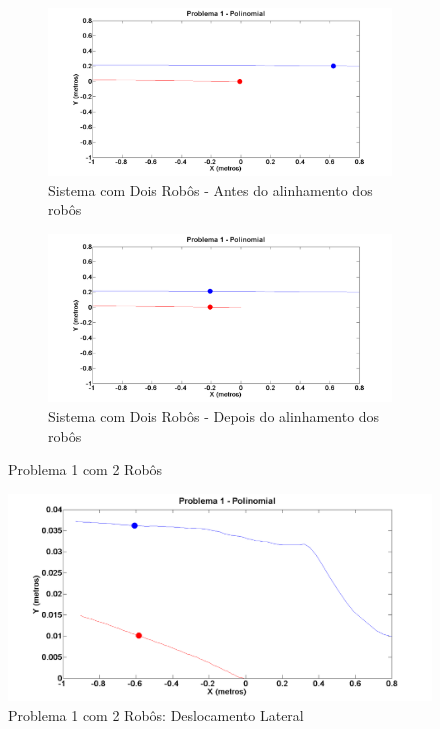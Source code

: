 \begin{figure}[!htb]
	\centering
	\begin{subfigure}{1.0\textwidth}
		\centering
		\includegraphics[width=.9\linewidth]{./Testes/Problema1/Polinomial/P1Antes}
		\caption{Sistema com Dois Robôs - Antes do alinhamento dos robôs}
		\label{fig:P12Ini}
	\end{subfigure}
	\begin{subfigure}{1.0\textwidth}
		\centering
		\includegraphics[width=.9\linewidth]{./Testes/Problema1/Polinomial/P1Depois}
		\caption{Sistema com Dois Robôs - Depois do alinhamento dos robôs}
		\label{fig:P12Fim}
	\end{subfigure}
	\caption{Problema 1 com 2 Robôs}
	\label{fig:sP12}
\end{figure}

\begin{figure}[!htb]
		\centering
		\includegraphics[width=.9\linewidth]{./Testes/Problema1/Incremental/P1Depois}
	\caption{Problema 1 com 2 Robôs: Deslocamento Lateral}
	\label{fig:sP13}
\end{figure}

